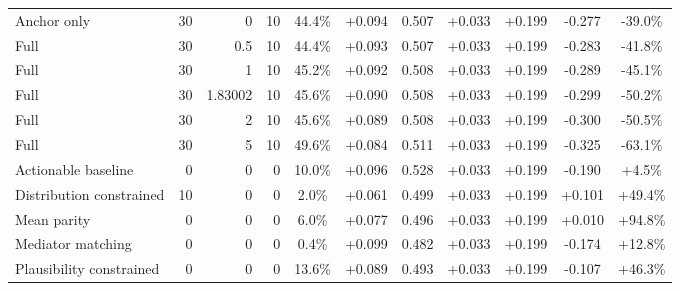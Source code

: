 \begin{table}[htbp]
\begin{tabular}{lrrrccccccc}
Anchor only & 30 & 0 & 10 & 44.4\% & +0.094 & 0.507 & +0.033 & +0.199 & -0.277 & -39.0\% \\
Full & 30 & 0.5 & 10 & 44.4\% & +0.093 & 0.507 & +0.033 & +0.199 & -0.283 & -41.8\% \\
Full & 30 & 1 & 10 & 45.2\% & +0.092 & 0.508 & +0.033 & +0.199 & -0.289 & -45.1\% \\
Full & 30 & 1.83002 & 10 & 45.6\% & +0.090 & 0.508 & +0.033 & +0.199 & -0.299 & -50.2\% \\
Full & 30 & 2 & 10 & 45.6\% & +0.089 & 0.508 & +0.033 & +0.199 & -0.300 & -50.5\% \\
Full & 30 & 5 & 10 & 49.6\% & +0.084 & 0.511 & +0.033 & +0.199 & -0.325 & -63.1\% \\
Actionable baseline & 0 & 0 & 0 & 10.0\% & +0.096 & 0.528 & +0.033 & +0.199 & -0.190 & +4.5\% \\
Distribution constrained & 10 & 0 & 0 & 2.0\% & +0.061 & 0.499 & +0.033 & +0.199 & +0.101 & +49.4\% \\
Mean parity & 0 & 0 & 0 & 6.0\% & +0.077 & 0.496 & +0.033 & +0.199 & +0.010 & +94.8\% \\
Mediator matching & 0 & 0 & 0 & 0.4\% & +0.099 & 0.482 & +0.033 & +0.199 & -0.174 & +12.8\% \\
Plausibility constrained & 0 & 0 & 0 & 13.6\% & +0.089 & 0.493 & +0.033 & +0.199 & -0.107 & +46.3\% \\
\bottomrule
\end{tabular}
\end{table}